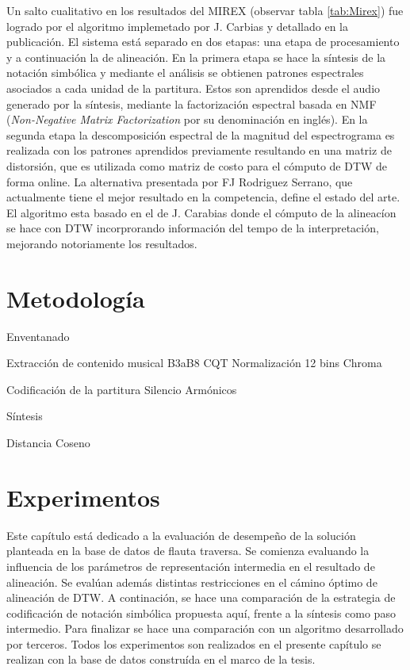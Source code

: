 \documentclass
  [ams,pdfout]%
	{aeslac}
\begin{document}
Un salto cualitativo en los resultados del MIREX (observar tabla \ref{tab:Mirex}) fue logrado por el algoritmo implemetado por J. Carbias y detallado en la publicación\cite{carabias2015audio}. El sistema está separado en dos etapas: una etapa de procesamiento y a continuación la de alineación. En la primera etapa se hace la síntesis de la notación simbólica y mediante el análisis se obtienen patrones espectrales asociados a cada unidad de la partitura. Estos son aprendidos desde el audio generado por la síntesis, mediante la factorización espectral basada en NMF (\textit{Non-Negative Matrix Factorization} por su denominación en inglés). En la segunda etapa la descomposición espectral de la magnitud del espectrograma es realizada con los patrones aprendidos previamente resultando en una matriz de distorsión, que es utilizada como matriz de costo para el cómputo de DTW de forma online. La alternativa presentada por FJ Rodriguez Serrano\cite{rodriguez2017tempo}, que actualmente tiene el mejor resultado en la competencia, define el estado del arte. El algoritmo esta basado en el de J. Carabias donde el cómputo de la alineacíon se hace con DTW incorprorando información del tempo de la interpretación, mejorando notoriamente los resultados.


\section{Metodología}
Enventanado

Extracción de contenido musical
	B3aB8 CQT
	Normalización
	12 bins Chroma

Codificación de la partitura
	Silencio
	Armónicos

Síntesis

Distancia Coseno


\section{Experimentos}

Este capítulo está dedicado a la evaluación de desempeño de la solución planteada en la base de datos de flauta traversa. Se comienza evaluando la influencia de los parámetros de representación intermedia en el resultado de alineación. Se evalúan además distintas restricciones en el cámino óptimo de alineación de DTW. A continación, se hace una comparación de la estrategia de codificación de notación simbólica propuesta aquí, frente a la síntesis como paso intermedio. Para finalizar se hace una comparación con un algoritmo desarrollado por terceros. Todos los experimentos son realizados en el presente capítulo se realizan con la base de datos construída en el marco de la tesis. 
\end{document}
